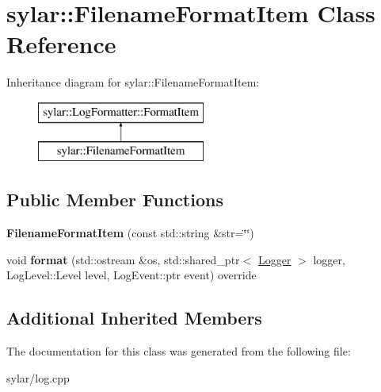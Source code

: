 \hypertarget{classsylar_1_1FilenameFormatItem}{\section{sylar\-:\-:Filename\-Format\-Item Class Reference}
\label{classsylar_1_1FilenameFormatItem}
}
Inheritance diagram for sylar\-:\-:Filename\-Format\-Item\-:\begin{figure}[H]
\begin{center}
\leavevmode
\includegraphics[height=2.000000cm]{classsylar_1_1FilenameFormatItem}
\end{center}
\end{figure}
\subsection*{Public Member Functions}
\begin{DoxyCompactItemize}
\item 
\hypertarget{classsylar_1_1FilenameFormatItem_a9d149aee31507d1a70ceea2e747bfd26}{{\bfseries Filename\-Format\-Item} (const std\-::string \&str=\char`\"{}\char`\"{})}\label{classsylar_1_1FilenameFormatItem_a9d149aee31507d1a70ceea2e747bfd26}

\item 
\hypertarget{classsylar_1_1FilenameFormatItem_a4817789293a339ca61be41f1d07f4a64}{void {\bfseries format} (std\-::ostream \&os, std\-::shared\-\_\-ptr$<$ \hyperlink{classsylar_1_1Logger}{Logger} $>$ logger, Log\-Level\-::\-Level level, Log\-Event\-::ptr event) override}\label{classsylar_1_1FilenameFormatItem_a4817789293a339ca61be41f1d07f4a64}

\end{DoxyCompactItemize}
\subsection*{Additional Inherited Members}


The documentation for this class was generated from the following file\-:\begin{DoxyCompactItemize}
\item 
sylar/log.\-cpp\end{DoxyCompactItemize}
